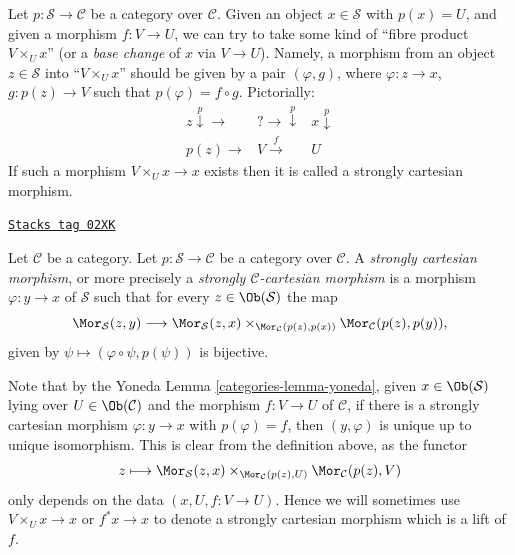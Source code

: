 \medskip\noindent
Let $p : \mathcal{S} \to \mathcal{C}$ be a category over $\mathcal{C}$.
Given an object $x \in \mathcal{S}$ with $p(x) = U$, and given a morphism
$f : V \to U$, we can try to take some kind of ``fibre product
$V \times_U x$'' (or a {\it base change} of $x$ via $V \to U$).
Namely, a morphism from an object $z \in \mathcal{S}$
into ``$V \times_U x$'' should be given by a pair
$(\varphi, g)$, where
$\varphi : z \to x$, $g : p(z) \to V$ such that
$p(\varphi) = f \circ g$. Pictorially:
$$
\begin{array}{ccc}z \overset{p}{\downarrow}\longrightarrow & ? \longrightarrow\overset{p}{\downarrow} & x \overset{p}{\downarrow} \\ p(z) \longrightarrow & V \overset{f}{\longrightarrow} & U\end{array}
$$
If such a morphism $V \times_U x \to x$ exists then it is called
a strongly cartesian morphism.

\begin{definition}
\label{categories-definition-cartesian-over-C}
\href{https://stacks.math.columbia.edu/tag/02XK}{\texttt{Stacks tag 02XK}}

Let $\mathcal{C}$ be a category.
Let $p : \mathcal{S} \to \mathcal{C}$ be a category over $\mathcal{C}$.
A {\it strongly cartesian morphism}, or more precisely a
{\it strongly $\mathcal{C}$-cartesian morphism} is a
morphism $\varphi : y \to x$ of $\mathcal{S}$ such that
for every $z \in \Ob(\mathcal{S})$ the map
$$
\Mor_\mathcal{S}(z, y)
\longrightarrow
\Mor_\mathcal{S}(z, x)
\times_{\Mor_\mathcal{C}(p(z), p(x))}
\Mor_\mathcal{C}(p(z), p(y)),
$$
given by $\psi \longmapsto (\varphi \circ \psi, p(\psi))$
is bijective.
\end{definition}

Note that by the Yoneda Lemma \ref{categories-lemma-yoneda}, given
$x \in \Ob(\mathcal{S})$ lying over $U \in \Ob(\mathcal{C})$
and the morphism $f : V \to U$ of $\mathcal{C}$, if there is a
strongly cartesian morphism $\varphi : y \to x$ with $p(\varphi) = f$,
then $(y, \varphi)$ is unique up to unique isomorphism. This is
clear from the definition above, as the functor
$$
z
\longmapsto
\Mor_\mathcal{S}(z, x)
\times_{\Mor_\mathcal{C}(p(z), U)}
\Mor_\mathcal{C}(p(z), V)
$$
only depends on the data $(x, U, f : V \to U)$. Hence we
will sometimes use $V \times_U x \to x$ or $f^*x \to x$
to denote a strongly cartesian morphism which is a lift of $f$.

